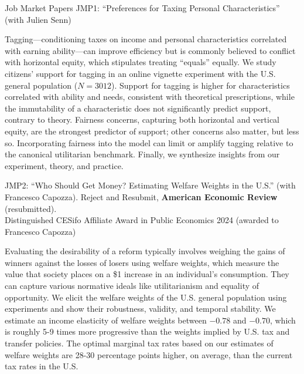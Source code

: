 \documentclass{resume} %
\begin{document}
\begin{rSection}{Job Market Papers}
  JMP1: ``Preferences for Taxing Personal Characteristics'' (with Julien Senn)

Tagging---conditioning taxes on income and personal characteristics correlated with earning ability---can improve efficiency but is commonly believed to conflict with horizontal equity, which stipulates treating ``equals'' equally. We study citizens' support for tagging in an online vignette experiment with the U.S. general population ($N=3012$). Support for tagging is higher for characteristics correlated with ability and needs, consistent with theoretical prescriptions, while the immutability of a characteristic does not significantly predict support, contrary to theory. Fairness concerns, capturing both horizontal and vertical equity, are the strongest predictor of support; other concerns also matter, but less so. Incorporating fairness into the model can limit or amplify tagging relative to the canonical utilitarian benchmark. Finally, we synthesize insights from our experiment, theory, and practice.

  JMP2:   ``Who Should Get Money? Estimating Welfare Weights in the U.S.'' (with Francesco Capozza). Reject and Resubmit, \textbf{American Economic Review} (resubmitted). \\ \vspace{0.6em}
  { \normalsize  \hspace*{0.6em} Distinguished CESifo Affiliate Award in Public Economics 2024 (awarded to Francesco Capozza)} 

  Evaluating the desirability of a reform typically involves weighing the gains of winners against the losses of losers using welfare weights, which measure the value that society places on a \$1 increase in an individual's consumption. They can capture various normative ideals like utilitarianism and equality of opportunity. We elicit the welfare weights of the U.S. general population using experiments and show their robustness, validity, and temporal stability. We estimate an income elasticity of welfare weights between $-0.78$ and $-0.70$, which is roughly 5-9 times more progressive than the weights implied by U.S. tax and transfer policies. The optimal marginal tax rates based on our estimates of welfare weights are 28-30 percentage points higher, on average, than the current tax rates in the U.S.
\end{rSection}
\end{document}
